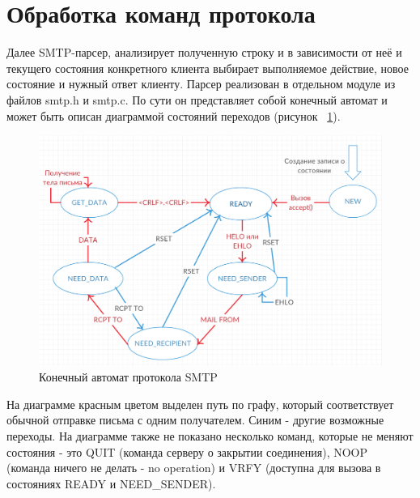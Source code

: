 \documentclass[a4paper,12pt]{report}
\begin{document}

\section{Обработка команд протокола}

Далее SMTP-парсер, анализирует полученную строку и в зависимости от неё и текущего состояния конкретного клиента выбирает выполняемое действие, новое состояние и нужный ответ клиенту. Парсер реализован в отдельном модуле из файлов smtp.h и smtp.c. По сути он представляет собой конечный автомат и может быть описан диаграммой состояний переходов (рисунок ~\ref{fig:smtp_fsm}).

\begin{figure}
\centering
\includegraphics[width=\textwidth]{diagramms/smtp_fsm.png}
\caption{Конечный автомат протокола SMTP}
\label{fig:smtp_fsm}
\end{figure}

На диаграмме красным цветом выделен путь по графу, который соответствует обычной отправке письма с одним получателем. Синим - другие возможные переходы. На диаграмме также не показано несколько команд, которые не меняют состояния - это QUIT (команда серверу о закрытии соединения), NOOP (команда ничего не делать - no operation) и VRFY (доступна для вызова в состояниях READY и NEED\_SENDER).
\end{document}
